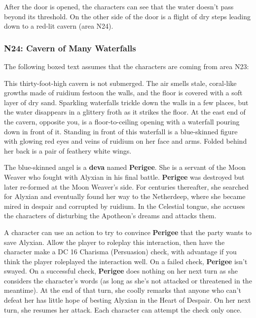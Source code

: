 \documentclass[a4paper, 11pt, bg=full, twocolumn, nooutline]{dndbook}
\begin{document}
After the door is opened, the characters can see that the water doesn't pass beyond its threshold. On the other side of the door is a flight of dry steps leading down to a red-lit cavern (area N24).

\subsubsection{N24: Cavern of Many Waterfalls}

The following boxed text assumes that the characters are coming from area N23:

\begin{DndReadAloud}
This thirty-foot-high cavern is not submerged. The air smells stale, coral-like growths made of ruidium festoon the walls, and the floor is covered with a soft layer of dry sand. Sparkling waterfalls trickle down the walls in a few places, but the water disappears in a glittery froth as it strikes the floor.
At the east end of the cavern, opposite you, is a floor-to-ceiling opening with a waterfall pouring down in front of it. Standing in front of this waterfall is a blue-skinned figure with glowing red eyes and veins of ruidium on her face and arms. Folded behind her back is a pair of feathery white wings.
\end{DndReadAloud}

The blue-skinned angel is a \textbf{deva} named \textbf{Perigee}. She is a servant of the Moon Weaver who fought with Alyxian in his final battle. \textbf{Perigee} was destroyed but later re-formed at the Moon Weaver's side. For centuries thereafter, she searched for Alyxian and eventually found her way to the Netherdeep, where she became mired in despair and corrupted by ruidium. In the Celestial tongue, she accuses the characters of disturbing the Apotheon's dreams and attacks them.


A character can use an action to try to convince \textbf{Perigee} that the party wants to save Alyxian. Allow the player to roleplay this interaction, then have the character make a DC 16 Charisma (Persuasion) check, with advantage if you think the player roleplayed the interaction well. On a failed check, \textbf{Perigee} isn't swayed. On a successful check, \textbf{Perigee} does nothing on her next turn as she considers the character's words (as long as she's not attacked or threatened in the meantime). At the end of that turn, she coolly remarks that anyone who can't defeat her has little hope of besting Alyxian in the Heart of Despair. On her next turn, she resumes her attack. Each character can attempt the check only once.
\end{document}
